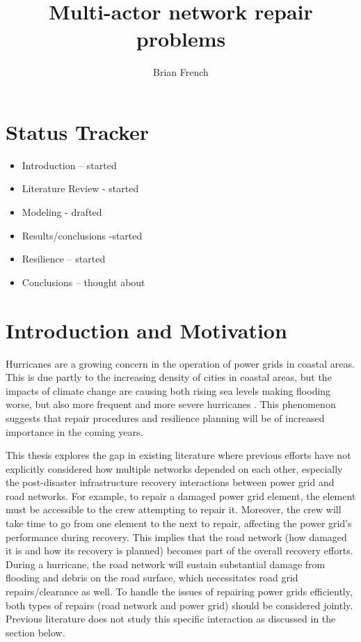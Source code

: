 \documentclass{article}
\begin{document}
	\title{Multi-actor network repair problems}
	\author{Brian French}
	\maketitle
	\section{Status Tracker}
	\begin{itemize}
		\item Introduction -- started
		\item Literature Review - started
		\item Modeling - drafted
		\item Results/conclusions -started
		\item Resilience -- started
		\item Conclusions -- thought about
	\end{itemize}
	
	\section{Introduction and Motivation}
	Hurricanes are a growing concern in the operation of power grids in coastal areas. This is due partly to the increasing density of cities in coastal areas, but the impacts of climate change are causing both rising sea levels making flooding worse, but also more frequent and more severe hurricanes \cite{MannEA2006}. This phenomenon suggests that repair procedures and resilience planning will be of increased importance in the coming years.
	
	This thesis explores the gap in existing literature where previous efforts have not explicitly considered how multiple networks depended on each other, especially the post-disaster infrastructure recovery interactions between power grid and road networks. For example, to repair a damaged power grid element, the element must be accessible to the crew attempting to repair it. Moreover, the crew will take time to go from one element to the next to repair, affecting the power grid's performance during recovery. This implies that the road network (how damaged it is and how its recovery is planned) becomes part of the overall recovery efforts. During a hurricane, the road network will sustain substantial damage from flooding and debris on the road surface, which necessitates road grid repairs/clearance as well. To handle the issues of repairing power grids efficiently, both types of repairs (road network and power grid) should be considered jointly. Previous literature does not study this specific interaction as discussed in the section below.
\end{document}
